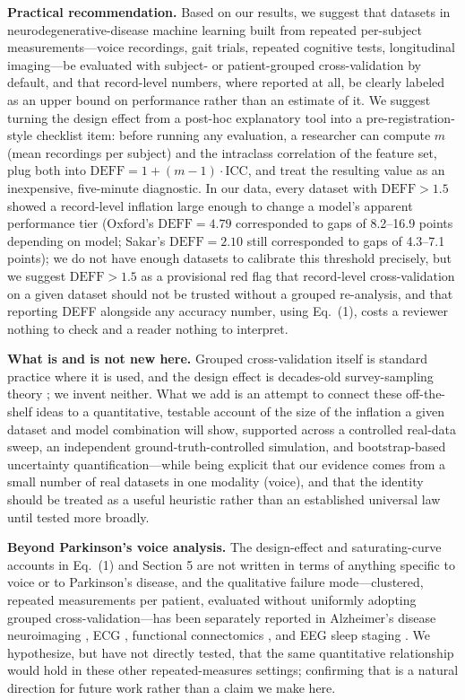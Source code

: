 \documentclass[11pt]{article}
\begin{document}
\textbf{Practical recommendation.} Based on our results, we suggest that datasets in neurodegenerative-disease machine learning built from repeated per-subject measurements---voice recordings, gait trials, repeated cognitive tests, longitudinal imaging---be evaluated with subject- or patient-grouped cross-validation by default, and that record-level numbers, where reported at all, be clearly labeled as an upper bound on performance rather than an estimate of it. We suggest turning the design effect from a post-hoc explanatory tool into a pre-registration-style checklist item: before running any evaluation, a researcher can compute $m$ (mean recordings per subject) and the intraclass correlation of the feature set, plug both into $\mathrm{DEFF} = 1+(m-1)\cdot\mathrm{ICC}$, and treat the resulting value as an inexpensive, five-minute diagnostic. In our data, every dataset with $\mathrm{DEFF} > 1.5$ showed a record-level inflation large enough to change a model's apparent performance tier (Oxford's $\mathrm{DEFF}=4.79$ corresponded to gaps of 8.2--16.9 points depending on model; Sakar's $\mathrm{DEFF}=2.10$ still corresponded to gaps of 4.3--7.1 points); we do not have enough datasets to calibrate this threshold precisely, but we suggest $\mathrm{DEFF} > 1.5$ as a provisional red flag that record-level cross-validation on a given dataset should not be trusted without a grouped re-analysis, and that reporting DEFF alongside any accuracy number, using Eq.\ (1), costs a reviewer nothing to check and a reader nothing to interpret.

\textbf{What is and is not new here.} Grouped cross-validation itself is standard practice where it is used, and the design effect is decades-old survey-sampling theory \cite{kish1965}; we invent neither. What we add is an attempt to connect these off-the-shelf ideas to a quantitative, testable account of the size of the inflation a given dataset and model combination will show, supported across a controlled real-data sweep, an independent ground-truth-controlled simulation, and bootstrap-based uncertainty quantification---while being explicit that our evidence comes from a small number of real datasets in one modality (voice), and that the identity should be treated as a useful heuristic rather than an established universal law until tested more broadly.

\textbf{Beyond Parkinson's voice analysis.} The design-effect and saturating-curve accounts in Eq.\ (1) and Section 5 are not written in terms of anything specific to voice or to Parkinson's disease, and the qualitative failure mode---clustered, repeated measurements per patient, evaluated without uniformly adopting grouped cross-validation---has been separately reported in Alzheimer's disease neuroimaging \cite{sifat2026}, ECG \cite{dechazal2004}, functional connectomics \cite{rosenblatt2024}, and EEG sleep staging \cite{koksal2026}. We hypothesize, but have not directly tested, that the same quantitative relationship would hold in these other repeated-measures settings; confirming that is a natural direction for future work rather than a claim we make here.
\end{document}
